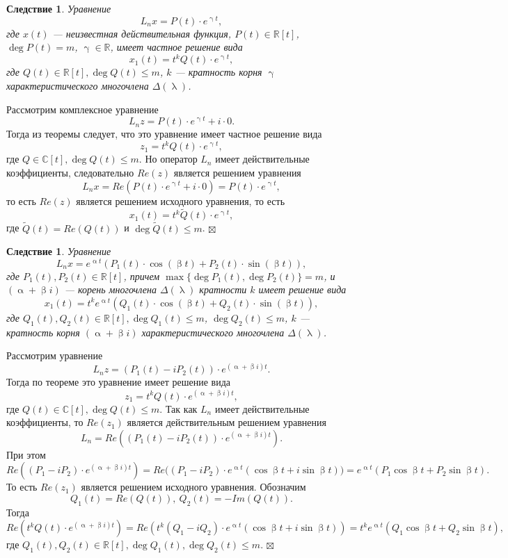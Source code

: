 \documentclass[a4paper, 12pt]{report}
\newenvironment{Proof} %
{\par\noindent{$\blacklozenge$}} %
{\hfill$\scriptstyle\boxtimes$}
\newcommand{\Rm}{\mathbb{R}}
\newcommand{\Cm}{\mathbb{C}}
\renewcommand{\alpha}{\upalpha}
\renewcommand{\beta}{\upbeta}
\renewcommand{\lambda}{\uplambda}
\begin{document}
\newtheorem*{2_5_2}{Следствие}\begin{2_5_2}
	Уравнение $$L_nx = P(t)\cdot e^{\upgamma t},$$ где $x(t)$ --- неизвестная действительная функция, $P(t)\in\Rm[t]$, $\deg P(t) = m$, $\upgamma \in \Rm$, имеет частное решение вида $$x_1(t) = t^kQ(t)\cdot e^{\upgamma t},$$ где $Q(t) \in \Rm[t], \deg Q(t) \leqslant m$, $k$ --- кратность корня $\upgamma$ характеристического многочлена $\Delta(\lambda)$.
\end{2_5_2}\begin{Proof}
Рассмотрим комплексное уравнение $$L_nz = P(t) \cdot e^{\upgamma t} + i\cdot 0.$$ Тогда из теоремы следует, что это уравнение имеет частное решение вида $$z_1 = t^kQ(t)\cdot e^{\upgamma t},$$ где $Q\in \Cm[t], \deg Q(t)\leqslant m$. Но оператор $L_n$ имеет действительные коэффициенты, следовательно $Re(z)$ является решением уравнения $$L_nx = Re(P(t)\cdot e^{\upgamma t} + i\cdot 0) = P(t)\cdot e^{\upgamma t},$$ то есть $Re(z)$ является решением исходного уравнения, то есть $$x_1(t) = t^k\widetilde{Q}(t)\cdot e^{\upgamma t},$$ где $\widetilde{Q}(t) = Re(Q(t))$ и $\deg \widetilde{Q}(t)\leqslant m$.
\end{Proof}
\newtheorem*{2_5_3}{Следствие}\begin{2_5_3}
	Уравнение $$L_nx = e^{\alpha t}(P_1(t)\cdot \cos(\beta t) + P_2(t)\cdot \sin (\beta t)),$$ где $P_1(t),P_2(t)\in \Rm[t]$, причем $\max\{\deg P_1(t),\deg P_2(t)\} = m$, и $(\alpha + \beta i)$ --- корень многочлена $\Delta (\lambda)$ кратности $k$ имеет решение вида $$x_1(t) = t^ke^{\alpha t}(Q_1(t)\cdot \cos(\beta t) + Q_2(t)\cdot \sin(\beta t)),$$ где $Q_1(t), Q_2(t) \in \Rm[t], \deg Q_1(t) \leqslant m$, $\deg Q_2(t) \leqslant m$, $k$ --- кратность корня $(\alpha + \beta i)$ характеристического многочлена $\Delta(\lambda)$.
\end{2_5_3}\begin{Proof}
Рассмотрим уравнение $$L_nz = (P_1(t) - i P_2(t))\cdot e^{(\alpha + \beta i)t}.$$ Тогда по теореме это уравнение имеет решение вида $$z_1= t^kQ(t)\cdot e^{(\alpha + \beta i)t},$$ где $Q(t)\in \Cm[t], \deg Q(t)\leqslant m$. Так как $L_n$ имеет действительные коэффициенты, то $Re(z_1)$ является действительным решением уравнения $$L_n = Re((P_1(t) - i P_2(t))\cdot e^{(\alpha + \beta i)t}).$$ 
При этом $$Re((P_1 - i P_2)\cdot e^{(\alpha + \beta i)t}) = Re\Big((P_1 - iP_2)\cdot e^{\alpha t}(\cos \beta t + i \sin \beta t)\Big) = e^{\alpha t}(P_1 \cos \beta t  + P_2 \sin \beta t).$$ То есть $Re(z_1)$ является решением исходного уравнения. Обозначим $$Q_1(t) = Re(Q(t)),\ Q_2(t) = -Im(Q(t)).$$ Тогда $$Re(t^kQ(t)\cdot e^{(\alpha + \beta i)t}) = Re(t^k(Q_1 - i Q_2)\cdot e^{\alpha t}(\cos \beta t + i \sin \beta t)) = t^ke^{\alpha t}(Q_1\cos \beta t + Q_2 \sin \beta t),$$ где $Q_1(t), Q_2(t) \in \Rm[t], \deg Q_1(t), \deg Q_2(t) \leqslant m$. 
\end{Proof}
\end{document}
